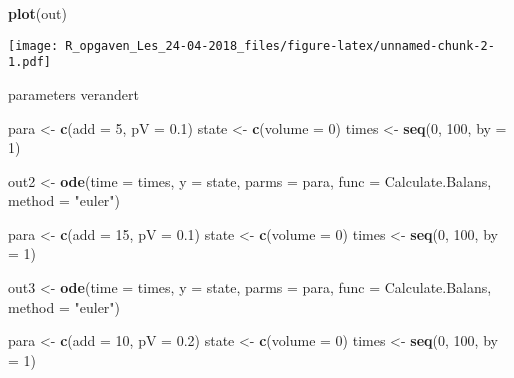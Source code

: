 \documentclass[]{article}
\newenvironment{Shaded}{\begin{snugshade}}{\end{snugshade}}
\newcommand{\KeywordTok}[1]{\textcolor[rgb]{0.13,0.29,0.53}{\textbf{#1}}}
\newcommand{\DataTypeTok}[1]{\textcolor[rgb]{0.13,0.29,0.53}{#1}}
\newcommand{\DecValTok}[1]{\textcolor[rgb]{0.00,0.00,0.81}{#1}}
\newcommand{\FloatTok}[1]{\textcolor[rgb]{0.00,0.00,0.81}{#1}}
\newcommand{\StringTok}[1]{\textcolor[rgb]{0.31,0.60,0.02}{#1}}
\newcommand{\NormalTok}[1]{#1}
\begin{document}
\begin{Shaded}
\begin{Highlighting}[]
\KeywordTok{plot}\NormalTok{(out)}
\end{Highlighting}
\end{Shaded}

\texttt{[image: R\_opgaven\_Les\_24-04-2018\_files/figure-latex/unnamed-chunk-2-1.pdf]}

parameters verandert

\begin{Shaded}
\begin{Highlighting}[]
\NormalTok{para <-}\StringTok{ }\KeywordTok{c}\NormalTok{(}\DataTypeTok{add =} \DecValTok{5}\NormalTok{, }\DataTypeTok{pV =} \FloatTok{0.1}\NormalTok{)}
\NormalTok{state <-}\StringTok{ }\KeywordTok{c}\NormalTok{(}\DataTypeTok{volume =} \DecValTok{0}\NormalTok{)}
\NormalTok{times <-}\StringTok{ }\KeywordTok{seq}\NormalTok{(}\DecValTok{0}\NormalTok{, }\DecValTok{100}\NormalTok{,  }\DataTypeTok{by =} \DecValTok{1}\NormalTok{)}

\NormalTok{out2 <-}\StringTok{ }\KeywordTok{ode}\NormalTok{(}\DataTypeTok{time =}\NormalTok{ times,}
           \DataTypeTok{y =}\NormalTok{ state,}
           \DataTypeTok{parms =}\NormalTok{ para,}
           \DataTypeTok{func =}\NormalTok{ Calculate.Balans,}
           \DataTypeTok{method =} \StringTok{"euler"}\NormalTok{)}

\NormalTok{para <-}\StringTok{ }\KeywordTok{c}\NormalTok{(}\DataTypeTok{add =} \DecValTok{15}\NormalTok{, }\DataTypeTok{pV =} \FloatTok{0.1}\NormalTok{)}
\NormalTok{state <-}\StringTok{ }\KeywordTok{c}\NormalTok{(}\DataTypeTok{volume =} \DecValTok{0}\NormalTok{)}
\NormalTok{times <-}\StringTok{ }\KeywordTok{seq}\NormalTok{(}\DecValTok{0}\NormalTok{, }\DecValTok{100}\NormalTok{,  }\DataTypeTok{by =} \DecValTok{1}\NormalTok{)}

\NormalTok{out3 <-}\StringTok{ }\KeywordTok{ode}\NormalTok{(}\DataTypeTok{time =}\NormalTok{ times,}
           \DataTypeTok{y =}\NormalTok{ state,}
           \DataTypeTok{parms =}\NormalTok{ para,}
           \DataTypeTok{func =}\NormalTok{ Calculate.Balans,}
           \DataTypeTok{method =} \StringTok{"euler"}\NormalTok{)}

\NormalTok{para <-}\StringTok{ }\KeywordTok{c}\NormalTok{(}\DataTypeTok{add =} \DecValTok{10}\NormalTok{, }\DataTypeTok{pV =} \FloatTok{0.2}\NormalTok{)}
\NormalTok{state <-}\StringTok{ }\KeywordTok{c}\NormalTok{(}\DataTypeTok{volume =} \DecValTok{0}\NormalTok{)}
\NormalTok{times <-}\StringTok{ }\KeywordTok{seq}\NormalTok{(}\DecValTok{0}\NormalTok{, }\DecValTok{100}\NormalTok{,  }\DataTypeTok{by =} \DecValTok{1}\NormalTok{)}


\end{Highlighting}
\end{Shaded}
\end{document}
